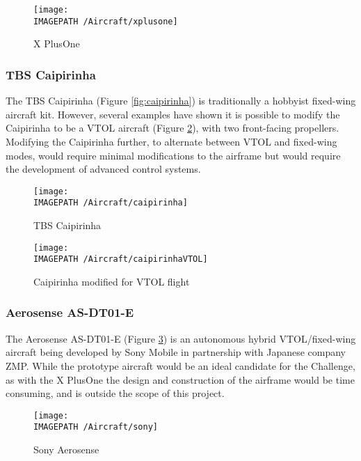 \begin{figure}[!h]
	\centering
	\texttt{[image: \\IMAGEPATH /Aircraft/xplusone]}
	\caption{X PlusOne}
	\label{fig:xplusone}
\end{figure}

\subsubsection*{TBS Caipirinha}
The TBS Caipirinha\cite{ref:caipirinha} (Figure \ref{fig:caipirinha}) is traditionally a hobbyist fixed-wing aircraft kit. However, several examples have shown it is possible to modify the Caipirinha to be a VTOL aircraft\cite{ref:caipirinhaVTOL} (Figure \ref{fig:caipirinhaVTOL}), with two front-facing propellers. Modifying the Caipirinha further, to alternate between VTOL and fixed-wing modes, would require minimal modifications to the airframe but would require the development of advanced control systems.

\begin{figure}[!ht]
	\centering
	\begin{minipage}{.5\textwidth}
		\centering
		\texttt{[image: \\IMAGEPATH /Aircraft/caipirinha]}
		\caption{TBS Caipirinha}
		\label{fig:caipirinha}
	\end{minipage}%
	\begin{minipage}{.5\textwidth}
		\centering
		\texttt{[image: \\IMAGEPATH /Aircraft/caipirinhaVTOL]}
		\caption{Caipirinha modified for VTOL flight}
		\label{fig:caipirinhaVTOL}
	\end{minipage}
\end{figure}

\subsubsection*{Aerosense AS-DT01-E}
The Aerosense AS-DT01-E\cite{ref:sony} (Figure \ref{fig:sony}) is an autonomous hybrid VTOL/fixed-wing aircraft being developed by Sony Mobile in partnership with Japanese company ZMP. While the prototype aircraft would be an ideal candidate for the Challenge, as with the X PlusOne the design and construction of the airframe would be time consuming, and is outside the scope of this project.

\begin{figure}[!ht]
	\centering
	\texttt{[image: \\IMAGEPATH /Aircraft/sony]}
	\caption{Sony Aerosense}
	\label{fig:sony}
\end{figure}

